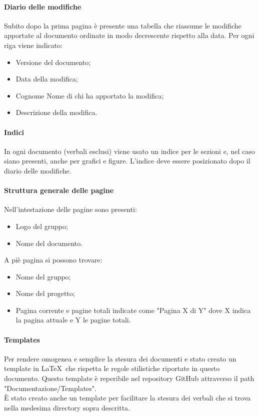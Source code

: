\documentclass[../NormeDiProgetto.tex]{subfiles}
\begin{document}
				\paragraph{Diario delle modifiche\\}
					Subito dopo la prima pagina è presente una tabella che riassume le modifiche
					apportate al documento ordinate in modo decrescente rispetto alla data.
					Per ogni riga viene indicato:
					\begin{itemize}
						\item Versione del documento;
						\item Data della modifica;
						\item Cognome Nome di chi ha apportato la modifica;
						\item Descrizione della modifica.
					\end{itemize}
				\paragraph{Indici\\}
					In ogni documento (verbali esclusi) viene usato un indice per le sezioni e, nel caso siano
					presenti, anche per grafici e figure. L'indice deve essere posizionato dopo il diario
					delle modifiche.
				\paragraph{Struttura generale delle pagine\\}
					Nell'intestazione delle pagine sono presenti:
					\begin{itemize}
						\item Logo del gruppo;
						\item Nome del documento.
					\end{itemize}
					A piè pagina si possono trovare:    
					\begin{itemize}
						\item Nome del gruppo;
						\item Nome del progetto;
						\item Pagina corrente e pagine totali indicate come "Pagina X di Y" dove
						X indica la pagina attuale e Y le pagine totali.
					\end{itemize}
				\paragraph{Templates\\}
					Per rendere omogenea e semplice la stesura dei documenti e stato creato un
					template in \LaTeX\ che rispetta le regole stilistiche riportate in
					questo documento.
					Questo template è reperibile nel repository GitHub attraverso il path
					"Documentazione/Templates".\\
					È stato creato anche un template per facilitare la stesura dei verbali che si
					trova nella medesima directory sopra descritta.
\end{document}
